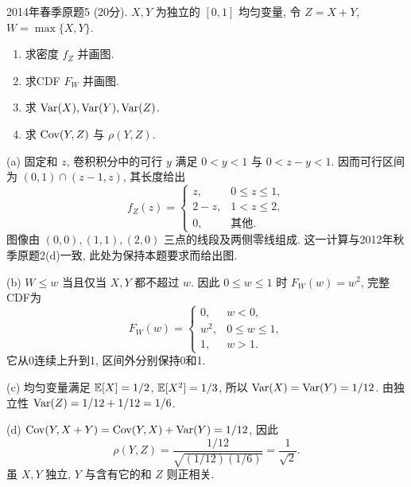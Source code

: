 \begin{exercise}\label{m2:2014s:q5}
2014年春季原题5 (20分). $X,Y$ 为独立的 $[0,1]$ 均匀变量, 令 $Z=X+Y$, $W=\max\{X,Y\}$.
\begin{enumerate}
\item[(a)]\label{m2:2014s:q5:a} 求密度 $f_Z$ 并画图.
\item[(b)]\label{m2:2014s:q5:b} 求CDF $F_W$ 并画图.
\item[(c)]\label{m2:2014s:q5:c} 求 $\operatorname{Var}(X),\operatorname{Var}(Y),\operatorname{Var}(Z)$.
\item[(d)]\label{m2:2014s:q5:d} 求 $\operatorname{Cov}(Y,Z)$ 与 $\rho(Y,Z)$.
\end{enumerate}
\end{exercise}
\begin{solution}
(a) 固定和 $z$, 卷积积分中的可行 $y$ 满足 $0<y<1$ 与 $0<z-y<1$. 因而可行区间为 $(0,1)\cap(z-1,z)$, 其长度给出
\[
f_Z(z)=\begin{cases}z,&0\le z\le1,\\2-z,&1<z\le2,\\0,&\text{其他}.\end{cases}
\]
图像由 $(0,0),(1,1),(2,0)$ 三点的线段及两侧零线组成. 这一计算与2012年秋季原题2(d)一致, 此处为保持本题要求而给出图.

(b) $W\le w$ 当且仅当 $X,Y$ 都不超过 $w$. 因此 $0\le w\le1$ 时 $F_W(w)=w^2$, 完整CDF为
\[
F_W(w)=\begin{cases}0,&w<0,\\w^2,&0\le w\le1,\\1,&w>1.\end{cases}
\]
它从0连续上升到1, 区间外分别保持0和1.
\begin{center}
\qquad
{}
\end{center}

(c) 均匀变量满足 $\mathbb E[X]=1/2$, $\mathbb E[X^2]=1/3$, 所以 $\operatorname{Var}(X)=\operatorname{Var}(Y)=1/12$. 由独立性 $\operatorname{Var}(Z)=1/12+1/12=1/6$.

(d) $\operatorname{Cov}(Y,X+Y)=\operatorname{Cov}(Y,X)+\operatorname{Var}(Y)=1/12$, 因此
\[
\rho(Y,Z)=\frac{1/12}{\sqrt{(1/12)(1/6)}}=\frac1{\sqrt2}.
\]
虽 $X,Y$ 独立, $Y$ 与含有它的和 $Z$ 则正相关.
\end{solution}

